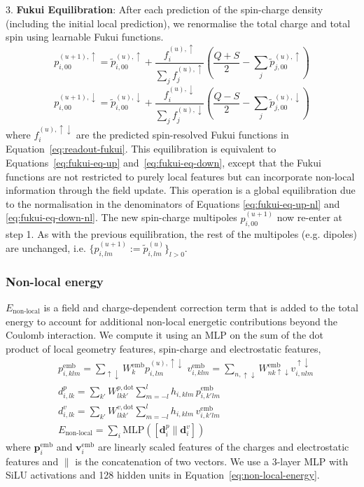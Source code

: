 \documentclass[aps,%
superscriptaddress,
 amsmath,amssymb,
floatfix,
twocolumn
]{revtex4-2}
\begin{document}
3. \textbf{Fukui Equilibration}: 
After each prediction of the spin-charge density (including the initial local prediction), we renormalise the total charge and total spin using learnable Fukui functions.
\begin{equation}
p_{i, 00}^{(u+1), \uparrow} = \tilde{p}_{i, 00}^{(u), \uparrow} + \frac{f_i^{(u), \uparrow}}{\sum_j f_j^{(u), \uparrow}} \left( \frac{Q + S}{2} - \sum_j \tilde{p}_{j, 00}^{(u),  \uparrow} \right)
\label{eq:fukui-eq-up-nl}
\end{equation}
\begin{equation}
p_{i, 00}^{(u+1), \downarrow} = \tilde{p}_{i, 00}^{(u),\downarrow} + \frac{f_i^{(u),\downarrow}}{\sum_j f_j^{(u), \downarrow}} \left( \frac{Q - S}{2} - \sum_j \tilde{p}_{j, 00}^{(u),\downarrow} \right)
\label{eq:fukui-eq-down-nl}
\end{equation}
where $f_i^{(u),\uparrow\downarrow}$ are the predicted spin-resolved Fukui functions in Equation~\ref{eq:readout-fukui}. This equilibration is equivalent to Equations~\ref{eq:fukui-eq-up} and~\ref{eq:fukui-eq-down}, except that the Fukui functions are not restricted to purely local features but can incorporate non-local information through the field update. This operation is a global equilibration due to the normalisation in the denominators of Equations \eqref{eq:fukui-eq-up-nl} and \eqref{eq:fukui-eq-down-nl}.
The new spin-charge multipoles $p_{i, 00}^{(u+1)}$ now re-enter at step 1. As with the previous equilibration, the rest of the multipoles (e.g. dipoles) are unchanged, i.e. $\{p_{i,lm}^{(u+1)}:=\tilde{p}^{(u)}_{i,lm}\}_{l>0}$.

\subsubsection{Non-local energy}
$E_{\text{non-local}}$ is a field and charge-dependent correction term that is added to the total energy to account for additional non-local energetic contributions beyond the Coulomb interaction. We compute it using an MLP on the sum of the dot product of local geometry features, spin-charge and electrostatic features,
%
\begin{align}
&p_{i,klm}^{\text{emb}} = \sum_{\uparrow \downarrow} W^{\text{emb}}_{k} p_{i,lm}^{(u), \uparrow \downarrow}\,\,v^{\text{emb}}_{i,klm} = \sum_{n,\uparrow \downarrow} W^{\text{emb}}_{nk \uparrow \downarrow} v_{i,nlm}^{\uparrow \downarrow} \\
&d^{p}_{i,lk} = \sum_{k'} W^{p,\mathrm{dot}}_{lkk'}
  \sum_{m=-l}^{l}
  h_{i,klm}\,p^{\mathrm{emb}}_{i,k'lm}\\
&d^{v}_{i,lk}
  =
  \sum_{k'} W^{v,\mathrm{dot}}_{lkk'}
  \sum_{m=-l}^{l}
  h_{i,klm}\,v^{\mathrm{emb}}_{i,k'lm}\\
 \label{eq:non-local-energy}
&E_{\text{non-local}} = \sum_i \mathrm{MLP}\!\left([\mathbf d_i^{p}\|\mathbf d_i^{v}]\right)
\end{align}
%
where $\boldsymbol{p}_i^{\text{emb}}$ and $\mathbf{v}_i^{\text{emb}}$ are linearly scaled features of the charges and electrostatic features and $\|$ is the concatenation of two vectors. We use a 3-layer MLP with SiLU activations and 128 hidden units in Equation~\ref{eq:non-local-energy}.
\end{document}
